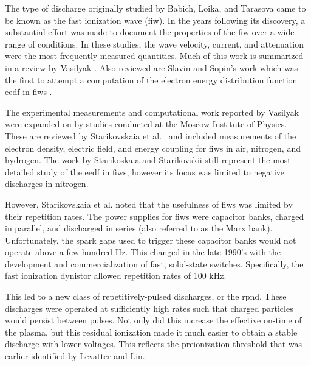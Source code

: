 The type of discharge originally studied by Babich, Loika, and Tarasova came to
be known as the fast ionization wave (\acs{fiw}). In the years following its
discovery, a substantial effort was made to document the properties of the
\acs{fiw} over a wide range of conditions. In these studies, the wave velocity,
current, and attenuation were the most frequently measured quantities. Much of
this work is summarized in a review by Vasilyak \cite{Vasilyak1994}. Also
reviewed are Slavin and Sopin's work which was the first to attempt a
computation of the electron energy distribution function \acs{eedf} in
\acs{fiw}s \cite{Slavin1992}.

The experimental measurements and computational work reported by Vasilyak were
expanded on by studies conducted at the Moscow Institute of Physics. These are
reviewed by Starikovskaia et al.~\cite{Starikovskaia2001} and included
measurements of the electron density, electric field, and energy coupling for
\acs{fiw}s in air, nitrogen, and hydrogen. The work by Starikoskaia and
Starikovskii still represent the most detailed study of the \acs{eedf}
in \acs{fiw}s, however its focus was limited to negative discharges in nitrogen.

However, Starikovskaia et al. noted that the usefulness of \acs{fiw}s was
limited by their repetition rates. The power supplies for \acs{fiw}s were
capacitor banks, charged in parallel, and discharged in series (also referred to
as the Marx bank). Unfortunately, the spark gaps used to trigger these
capacitor banks would not operate above a few hundred Hz. This changed in the
late 1990's with the development and commercialization of fast, solid-state
switches. Specifically, the fast ionization dynistor allowed repetition rates of
100 kHz.

This led to a new class of repetitively-pulsed discharges, or the \acs{rpnd}.
These discharges were operated at sufficiently high rates such that charged
particles would persist between pulses. Not only did this increase the effective
on-time of the plasma, but this residual ionization made it much easier to
obtain a stable discharge with lower voltages. This reflects the preionization
threshold that was earlier identified by Levatter and Lin.


